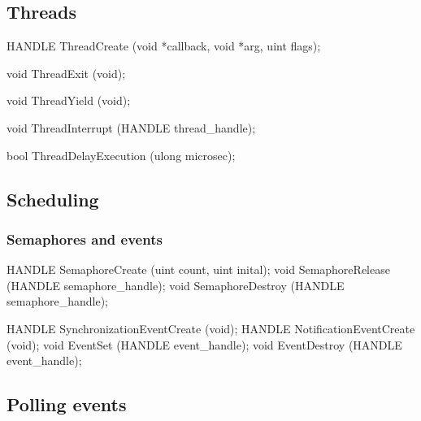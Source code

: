 \subsection{Threads}
\label{sec:abi:thread}


\begin{paldef}
HANDLE ThreadCreate (void *callback, void *arg,
                     uint flags);
\end{paldef}



\begin{paldef}
void ThreadExit (void);
\end{paldef}



\begin{paldef}
void ThreadYield (void);
\end{paldef}



\begin{paldef}
void ThreadInterrupt (HANDLE thread_handle);
\end{paldef}



\begin{paldef}
bool ThreadDelayExecution (ulong microsec);
\end{paldef}





\subsection{Scheduling}


\subsubsection*{Semaphores and events}

\begin{paldef}
HANDLE SemaphoreCreate (uint count, uint inital);
void SemaphoreRelease (HANDLE semaphore_handle);
void SemaphoreDestroy (HANDLE semaphore_handle);
\end{paldef}


\begin{paldef}
HANDLE SynchronizationEventCreate (void);
HANDLE NotificationEventCreate (void);
void EventSet (HANDLE event_handle);
void EventDestroy (HANDLE event_handle);
\end{paldef}



\subsection*{Polling events}

